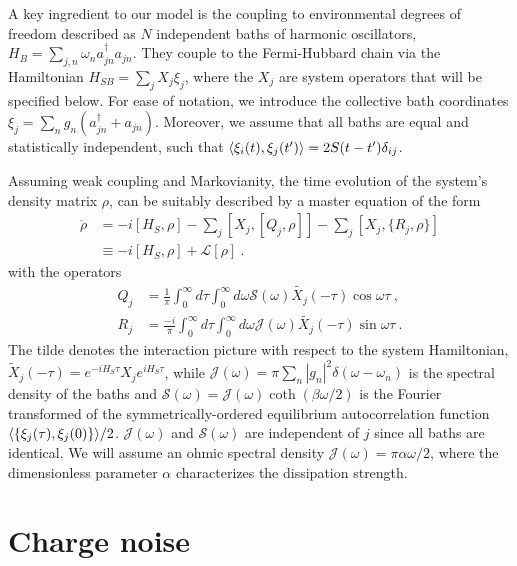 \documentclass[twocolumn,prb,showpacs]{revtex4-1}
\DeclarePairedDelimiter\mean{\langle}{\rangle}
\newcommand*{\diff}{d}
\begin{document}
A key ingredient to our model is the coupling to environmental degrees of
freedom described as $N$ independent baths of harmonic oscillators,
\cite{Leggett1987a,Hanggi1990a}
${H_B=\sum_{j,n}\omega_n a^\dagger_{jn} a_{jn}}$.  They couple to the
Fermi-Hubbard chain via the Hamiltonian ${H_{SB}=\sum_j X_j \xi_j}$,
where the $X_j$ are system operators that will be specified below.
For ease of notation, we introduce the collective bath coordinates
${\xi_j=\sum_n g_n (a^\dagger_{jn}+a_{jn})}$.  Moreover, we assume that all
baths are equal and statistically independent, such that
${\mean{\xi_i(t),\xi_j(t')}= 2S(t-t')\delta_{ij}}$.

Assuming weak coupling and Markovianity, the time evolution of the 
system's density matrix $\rho$, can be suitably described by a master equation 
of the form \cite{Redfield1957a,Breuer2007}
\begin{align}
\label{BlochRedfield}
    \dot{\rho} & = -i[H_S,\rho]-\sum_j [X_j,[Q_j,\rho]]- 
    \sum_j [X_j,\{R_j,\rho\}] \\
    & \equiv -i[H_S,\rho] + \mathcal{L}[\rho] \ .
    \nonumber
\end{align}
with the operators
\begin{align}
  Q_j & = \frac{1}{\pi}\int_0^\infty \diff\tau\int_0^\infty \diff\omega 
  \mathcal{S}(\omega)\tilde{X_j}(-\tau) \cos \omega\tau \ , \label{eq:R}\\
  R_j &= \frac{-i}{\pi}\int_0^\infty \diff\tau\int_0^\infty \diff\omega 
  \mathcal{J}(\omega)\tilde{X_j}(-\tau) \sin \omega\tau \ . \label{eq:Q}
\end{align}
The tilde denotes the interaction picture with respect to the system
Hamiltonian, ${\tilde{X}_j(-\tau)=e^{-i H_S\tau}X_je^{i H_S\tau}}$, while
${\mathcal{J}(\omega)=\pi\sum_n |g_n|^2 \delta(\omega- \omega_n)}$ is the
spectral density of the baths and
${\mathcal{S}(\omega)=\mathcal{J}(\omega)\coth(\beta\omega/2)}$ is the
Fourier transformed of the symmetrically-ordered equilibrium
autocorrelation function $\mean{\{\xi_j(\tau),\xi_j(0)\}}/2$.
$\mathcal{J}(\omega)$ and $\mathcal{S}(\omega)$ are independent of $j$
since all baths are identical. We will assume an ohmic spectral density
${\mathcal{J}(\omega)=\pi\alpha\omega/2}$, where the dimensionless parameter
$\alpha$ characterizes the dissipation strength.
 

\section{Charge noise}
\label{sec:charge}
\end{document}
